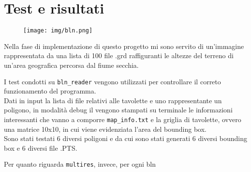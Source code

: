 \chapter{Test e risultati}
	\begin{figure}[!bp]
		\centering
		\texttt{[image: img/bln.png]}
	\end{figure}
	Nella fase di implementazione di questo progetto mi sono servito di un'immagine rappresentata da una lista di 100 file .grd raffiguranti le altezze del terreno di un'area geografica percorsa dal fiume secchia.

	I test condotti su \texttt{bln\_reader} vengono utilizzati per controllare il correto funzionamento del programma.\\
	Dati in input la lista di file relativi alle tavolette e uno rappresentante un poligono, in modalit\`{a} debug il vengono stampati su terminale le informazioni interessanti che vanno a comporre \texttt{map\_info.txt} e la griglia di tavolette, ovvero una matrice 10x10, in cui viene evidenziata l'area del bounding box. \\
	Sono stati testati 6 diversi poligoni e da cui sono stati generati 6 diversi bounding box e 6 diversi file .PTS.
	

	Per quanto riguarda \texttt{multires}, invece, per ogni bln 
